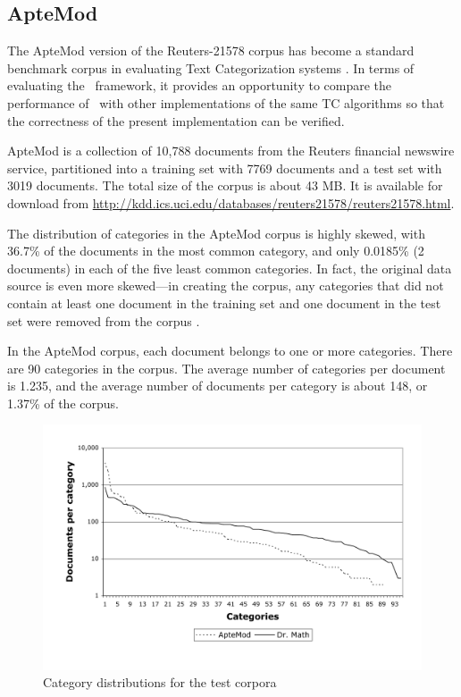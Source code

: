 \subsection{ApteMod}


The ApteMod version of the Reuters-21578 corpus has become a standard
benchmark corpus in evaluating Text Categorization
systems \cite{yang:99,joachims:98}. In terms of evaluating the \aicat\
framework, it provides an opportunity to compare the performance of
\aicat\ with other implementations of the same TC algorithms so that
the correctness of the present implementation can be verified.

ApteMod is a collection of 10,788 documents from the Reuters financial
newswire service, partitioned into a training set with 7769
documents and a test set with 3019 documents.  The total size of the
corpus is about 43 MB.  It is available for download from
\url{http://kdd.ics.uci.edu/databases/reuters21578/reuters21578.html}.

The distribution of categories in the ApteMod corpus is highly skewed,
with 36.7\% of the documents in the most common category, and only
0.0185\% (2 documents) in each of the five least common categories.
In fact, the original data source is even more skewed---in creating
the corpus, any categories that did not contain at least one document
in the training set and one document in the test set were removed from
the corpus \cite{yang:99}.

In the ApteMod corpus, each document belongs to one or more
categories.  There are 90 categories in the corpus.  The average
number of categories per document is 1.235, and the average number of
documents per category is about 148, or 1.37\% of the corpus.

\begin{figure}
\begin{center}
\includegraphics[width=\linewidth]{figures/Corpora-catdist.pdf}
\caption{Category distributions for the test corpora}
\label{Corpora-catdist}
\end{center}
\end{figure}

